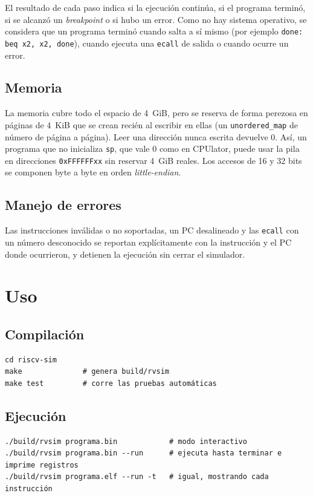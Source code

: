 \documentclass[11pt,a4paper]{article}
\begin{document}
El resultado de cada paso indica si la ejecución continúa, si el programa terminó, si se
alcanzó un \textit{breakpoint} o si hubo un error. Como no hay sistema operativo, se
considera que un programa terminó cuando salta a sí mismo (por ejemplo
\texttt{done: beq x2, x2, done}), cuando ejecuta una \texttt{ecall} de salida o cuando
ocurre un error.

\subsection{Memoria}

La memoria cubre todo el espacio de 4~GiB, pero se reserva de forma perezosa en páginas
de 4~KiB que se crean recién al escribir en ellas (un \texttt{unordered\_map} de número
de página a página). Leer una dirección nunca escrita devuelve 0. Así, un programa que
no inicializa \texttt{sp}, que vale 0 como en CPUlator, puede usar la pila en
direcciones \texttt{0xFFFFFFxx} sin reservar 4~GiB reales. Los accesos de 16 y 32 bits
se componen byte a byte en orden \textit{little-endian}.

\subsection{Manejo de errores}

Las instrucciones inválidas o no soportadas, un PC desalineado y las \texttt{ecall} con
un número desconocido se reportan explícitamente con la instrucción y el PC donde
ocurrieron, y detienen la ejecución sin cerrar el simulador.

\section{Uso}

\subsection{Compilación}

\begin{Verbatim}
cd riscv-sim
make              # genera build/rvsim
make test         # corre las pruebas automáticas
\end{Verbatim}

\subsection{Ejecución}

\begin{Verbatim}
./build/rvsim programa.bin            # modo interactivo
./build/rvsim programa.bin --run      # ejecuta hasta terminar e imprime registros
./build/rvsim programa.elf --run -t   # igual, mostrando cada instrucción
\end{Verbatim}
\end{document}
